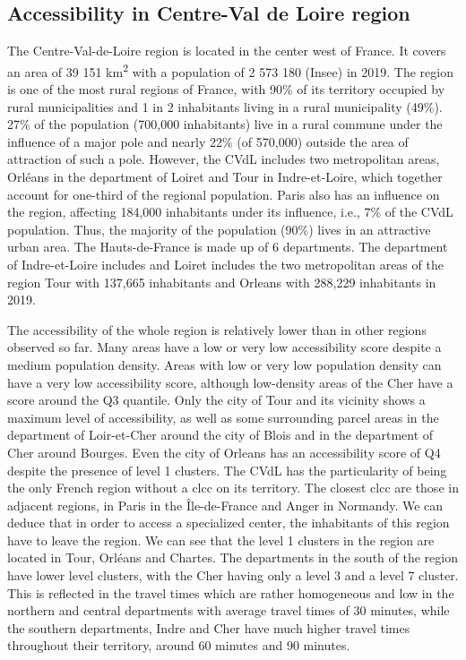 \subsection*{Accessibility in Centre-Val de Loire region}

The Centre-Val-de-Loire region is located in the center west of France. It
covers an area of 39 151 km\textsuperscript{2} with a population of 2 573 180
(Insee) in 2019. The region is one of the most rural regions of France, with
90\% of its territory occupied by rural municipalities and 1 in 2 inhabitants
living in a rural municipality (49\%). 27\% of the population (700,000
inhabitants) live in a rural commune under the influence of a major pole and
nearly 22\% (of 570,000) outside the area of attraction of such a pole. However,
the CVdL includes two metropolitan areas, Orléans in the department of Loiret
and Tour in Indre-et-Loire, which together account for one-third of the regional
population. Paris also has an influence on the region, affecting 184,000
inhabitants under its influence, i.e., 7\% of the CVdL population. Thus, the
majority of the population (90\%) lives in an attractive urban area. The
Hauts-de-France is made up of 6 departments. The department of Indre-et-Loire
includes and Loiret includes the two metropolitan areas of the region Tour with
137,665 inhabitants and Orleans with 288,229 inhabitants in 2019.

The accessibility of the whole region is relatively lower than in other regions
observed so far. Many areas have a low or very low accessibility score despite a
medium population density. Areas with low or very low population density can
have a very low accessibility score, although low-density areas of the Cher have
a score around the Q3 quantile. Only the city of Tour and its vicinity shows a
maximum level of accessibility, as well as some surrounding parcel areas in the
department of Loir-et-Cher around the city of Blois and in the department of
Cher around Bourges. Even the city of Orleans has an accessibility score of Q4
despite the presence of level 1 clusters. The CVdL has the particularity of
being the only French region without a \ac{clcc} on its territory. The closest
\ac{clcc} are those in adjacent regions, in Paris in the Île-de-France and Anger
in Normandy. We can deduce that in order to access a specialized center, the
inhabitants of this region have to leave the region.  We can see that the level
1 clusters in the region are located in Tour, Orléans and Chartes. The
departments in the south of the region have lower level clusters, with the Cher
having only a level 3 and a level 7 cluster. This is reflected in the travel
times which are rather homogeneous and low in the northern and central
departments with average travel times of 30 minutes, while the southern
departments, Indre and Cher have much higher travel times throughout their
territory, around 60 minutes and 90 minutes.

